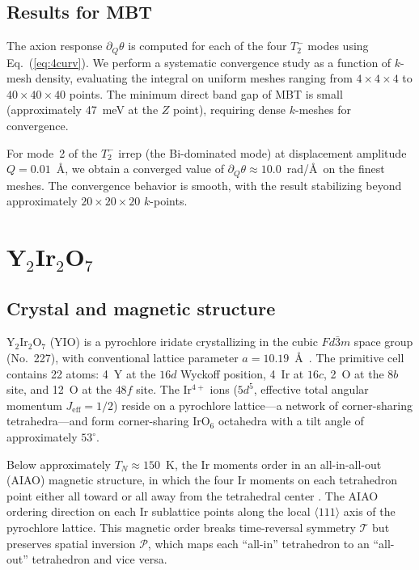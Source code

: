 \documentclass[galley,aps,pra,10pt,amsmath,amssymb,
    superscriptaddress,nofootinbib,longbibliography]{revtex4-2}
\def\Red#1{\textcolor{red}{#1}}
\newcounter{comm}
\newcommand{\seclab}[1]{\label{sec:#1}{\Red{\small\;\;[sec:~#1]}}}
\newcommand{\seclab}[1]{\label{sec:#1}}
\newcommand{\eq}[1]{Eq.~(\ref{eq:#1})}
\begin{document}
\subsection{Results for MBT}

The axion response $\partial_Q \theta$ is computed for each of the four $T_2^-$ modes using \eq{4curv}.
We perform a systematic convergence study as a function of $k$-mesh density, evaluating the integral on uniform meshes ranging from $4 \times 4 \times 4$ to $40 \times 40 \times 40$ points.
The minimum direct band gap of MBT is small (approximately 47~meV at the $Z$ point), requiring dense $k$-meshes for convergence.

For mode~2 of the $T_2^-$ irrep (the Bi-dominated mode) at displacement amplitude $Q = 0.01$~\AA, we obtain a converged value of $\partial_Q \theta \approx 10.0$~rad/\AA\ on the finest meshes.
The convergence behavior is smooth, with the result stabilizing beyond approximately $20 \times 20 \times 20$ $k$-points.

\section{Y$_2$Ir$_2$O$_7$}
\seclab{YIO}

\subsection{Crystal and magnetic structure}

Y$_2$Ir$_2$O$_7$ (YIO) is a pyrochlore iridate crystallizing in the cubic $Fd\bar{3}m$ space group (No.~227), with conventional lattice parameter $a = 10.19$~\AA\ \cite{wan2011topological, witczak2014correlated}.
The primitive cell contains 22 atoms: 4~Y at the $16d$ Wyckoff position, 4~Ir at $16c$, 2~O at the $8b$ site, and 12~O at the $48f$ site.
The Ir$^{4+}$ ions ($5d^5$, effective total angular momentum $J_\text{eff} = 1/2$) reside on a pyrochlore lattice---a network of corner-sharing tetrahedra---and form corner-sharing IrO$_6$ octahedra with a tilt angle of approximately $53^\circ$.

Below approximately $T_N \approx 150$~K, the Ir moments order in an all-in-all-out (AIAO) magnetic structure, in which the four Ir moments on each tetrahedron point either all toward or all away from the tetrahedral center \cite{wan2011topological, pesin2010mott}. The AIAO ordering direction on each Ir sublattice points along the local $\langle 111 \rangle$ axis of the pyrochlore lattice. This magnetic order breaks time-reversal symmetry $\mathcal{T}$ but preserves spatial inversion $\mathcal{P}$, which maps each ``all-in'' tetrahedron to an ``all-out'' tetrahedron and vice versa. 
\end{document}
